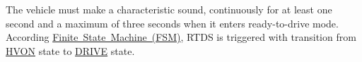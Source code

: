 The vehicle must make a characteristic sound, continuously for at least one second and a maximum of three seconds when it enters ready-\/to-\/drive mode. According \mbox{\hyperlink{_f_s_m_page}{Finite State Machine (F\+SM)}}, R\+T\+DS is triggered with transition from \mbox{\hyperlink{_f_s_m_page_HVON}{H\+V\+ON}} state to \mbox{\hyperlink{_f_s_m_page_DRIVE}{D\+R\+I\+VE}} state. 